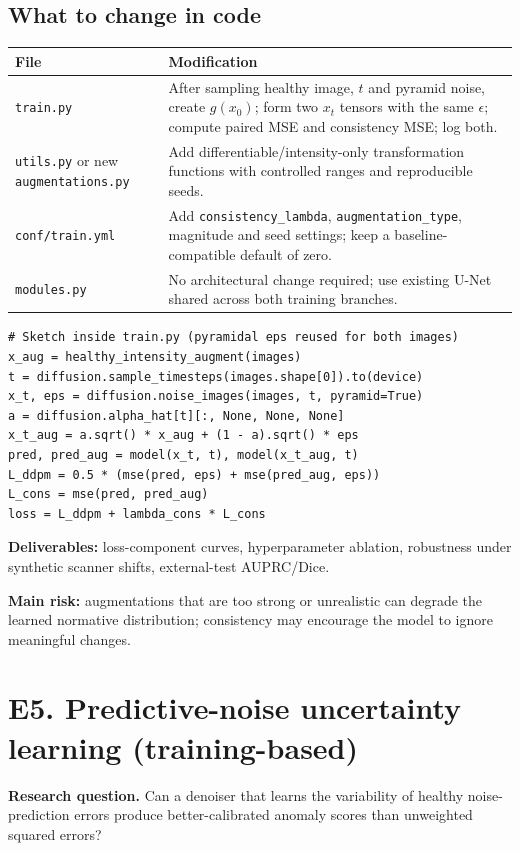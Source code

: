 \documentclass[10pt,a4paper]{article}
\newcommand{\file}[1]{\nolinkurl{#1}}
\newcommand{\hyps}[1]{\begin{summarybox}\textbf{Research question.} #1\end{summarybox}}
\begin{document}
\subsection{What to change in code}
\begin{tabularx}{\linewidth}{@{}p{39mm}X@{}}
\toprule File & Modification\\\midrule
\file{train.py} & After sampling healthy image, $t$ and pyramid noise, create $g(x_0)$; form two $x_t$ tensors with the same $\epsilon$; compute paired MSE and consistency MSE; log both.\\
\file{utils.py} or new \file{augmentations.py} & Add differentiable/intensity-only transformation functions with controlled ranges and reproducible seeds.\\
\file{conf/train.yml} & Add \file{consistency_lambda}, \file{augmentation_type}, magnitude and seed settings; keep a baseline-compatible default of zero.\\
\file{modules.py} & No architectural change required; use existing U-Net shared across both training branches.\\\bottomrule
\end{tabularx}
\begin{lstlisting}
# Sketch inside train.py (pyramidal eps reused for both images)
x_aug = healthy_intensity_augment(images)
t = diffusion.sample_timesteps(images.shape[0]).to(device)
x_t, eps = diffusion.noise_images(images, t, pyramid=True)
a = diffusion.alpha_hat[t][:, None, None, None]
x_t_aug = a.sqrt() * x_aug + (1 - a).sqrt() * eps
pred, pred_aug = model(x_t, t), model(x_t_aug, t)
L_ddpm = 0.5 * (mse(pred, eps) + mse(pred_aug, eps))
L_cons = mse(pred, pred_aug)
loss = L_ddpm + lambda_cons * L_cons
\end{lstlisting}
\textbf{Deliverables:} loss-component curves, hyperparameter ablation, robustness under synthetic scanner shifts, external-test AUPRC/Dice.\par
\textbf{Main risk:} augmentations that are too strong or unrealistic can degrade the learned normative distribution; consistency may encourage the model to ignore meaningful changes.
\section{E5. Predictive-noise uncertainty learning (training-based)}
\hyps{Can a denoiser that learns the variability of healthy noise-prediction errors produce better-calibrated anomaly scores than unweighted squared errors?}
\end{document}

